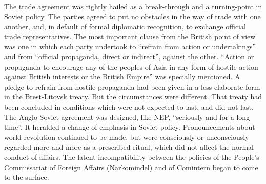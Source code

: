 The trade agreement was rightly hailed as a break-through and a turning-point in Soviet policy. The parties agreed to put no obstacles in the way of trade with one another, and, in default of formal diplomatic recognition, to exchange official trade representatives. The most important clause from the British point of view was one in which each party undertook to ``refrain from action or undertakings'' and from ``official propaganda, direct or indirect'', against the other. ``Action or propaganda to encourage any of the peoples of Asia in any form of hostile action against British interests or the British Empire'' was specially mentioned. A pledge to refrain from hostile propaganda had been given in a less elaborate form in the Brest-Litovsk treaty. But the circumstances were different. That treaty had been concluded in conditions which were not expected to last, and did not last. The Anglo-Soviet agreement was designed, like NEP, ``seriously and for a long time''. It heralded a change of emphasis in Soviet policy. Pronouncements about world revolution continued to be made, but were consciously or unconsciously regarded more and more as a prescribed ritual, which did not affect the normal conduct of affairs. The latent incompatibility between the policies of the People's Commissariat of Foreign Affairs (Narkomindel) and of Comintern began to come to the surface. 

